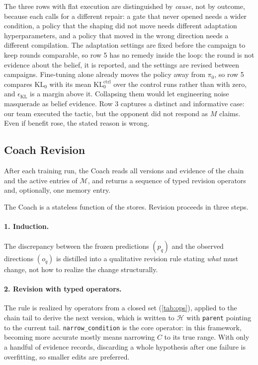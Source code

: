 \documentclass[11pt]{article}
\newcommand{\Hst}{\mathcal{H}}           %
\newcommand{\Mst}{\mathcal{M}}           %
\newcommand{\code}[1]{\texttt{\small #1}}
\begin{document}
The three rows with flat execution are distinguished by \emph{cause}, not by outcome, because each calls for a different repair: a gate that never opened needs a wider condition, a policy that the shaping did not move needs different adaptation hyperparameters, and a policy that moved in the wrong direction needs a different compilation.
The adaptation settings are fixed before the campaign to keep rounds comparable, so row 5 has no remedy inside the loop: the round is not evidence about the belief, it is reported, and the settings are revised between campaigns.
Fine-tuning alone already moves the policy away from $\pi_0$, so row 5 compares $\mathrm{KL}_0$ with its mean $\mathrm{KL}_0^{\mathrm{ctrl}}$ over the control runs rather than with zero, and $\epsilon_{\mathrm{KL}}$ is a margin above it.
Collapsing them would let engineering noise masquerade as belief evidence.
Row 3 captures a distinct and informative case: our team executed the tactic, but the opponent did not respond as $M$ claims.
Even if benefit rose, the stated reason is wrong.

\subsection{Coach Revision}
\label{sec:revision}

After each training run, the Coach reads all versions and evidence of the chain and the active entries of $\Mst$, and returns a sequence of typed revision operators and, optionally, one memory entry.

The Coach is a stateless function of the stores. Revision proceeds in three steps.

\paragraph{1. Induction.}
The discrepancy between the frozen predictions $(p_q)$ and the observed directions $(o_q)$ is distilled into a qualitative revision rule stating \emph{what} must change, not how to realize the change structurally.

\paragraph{2. Revision with typed operators.}
The rule is realized by operators from a closed set (\cref{tab:ops}), applied to the chain tail to derive the next version, which is written to $\Hst$ with \code{parent} pointing to the current tail.
\code{narrow\_condition} is the core operator: in this framework, becoming more accurate mostly means narrowing $C$ to its true range.
With only a handful of evidence records, discarding a whole hypothesis after one failure is overfitting, so smaller edits are preferred.
\end{document}
